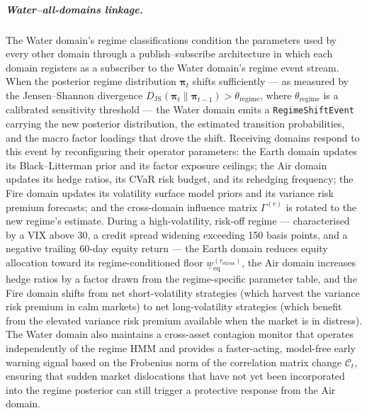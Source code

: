 \documentclass[12pt,openany]{book}
\numberwithin{equation}{chapter}
\theoremstyle{plain}
\theoremstyle{definition}
\theoremstyle{remark}
\begin{document}
\subparagraph{Water--all-domains linkage.}
The Water domain's regime classifications condition the parameters used by every other domain through a publish--subscribe architecture in which each domain registers as a subscriber to the Water domain's regime event stream. When the posterior regime distribution $\boldsymbol{\pi}_t$ shifts sufficiently — as measured by the Jensen--Shannon divergence $D_{\mathrm{JS}}(\boldsymbol{\pi}_t \| \boldsymbol{\pi}_{t-1}) > \theta_{\mathrm{regime}}$, where $\theta_{\mathrm{regime}}$ is a calibrated sensitivity threshold — the Water domain emits a \texttt{RegimeShiftEvent} carrying the new posterior distribution, the estimated transition probabilities, and the macro factor loadings that drove the shift. Receiving domains respond to this event by reconfiguring their operator parameters: the Earth domain updates its Black--Litterman prior and its factor exposure ceilings; the Air domain updates its hedge ratios, its CVaR risk budget, and its rehedging frequency; the Fire domain updates its volatility surface model priors and its variance risk premium forecasts; and the cross-domain influence matrix $\Gamma^{(r)}$ is rotated to the new regime's estimate. During a high-volatility, risk-off regime — characterised by a VIX above 30, a credit spread widening exceeding 150 basis points, and a negative trailing 60-day equity return — the Earth domain reduces equity allocation toward its regime-conditioned floor $\underline{w}^{(r_{\mathrm{stress}})}_{\mathrm{eq}}$, the Air domain increases hedge ratios by a factor drawn from the regime-specific parameter table, and the Fire domain shifts from net short-volatility strategies (which harvest the variance risk premium in calm markets) to net long-volatility strategies (which benefit from the elevated variance risk premium available when the market is in distress). The Water domain also maintains a cross-asset contagion monitor that operates independently of the regime HMM and provides a faster-acting, model-free early warning signal based on the Frobenius norm of the correlation matrix change $\mathcal{C}_t$, ensuring that sudden market dislocations that have not yet been incorporated into the regime posterior can still trigger a protective response from the Air domain.
\end{document}
